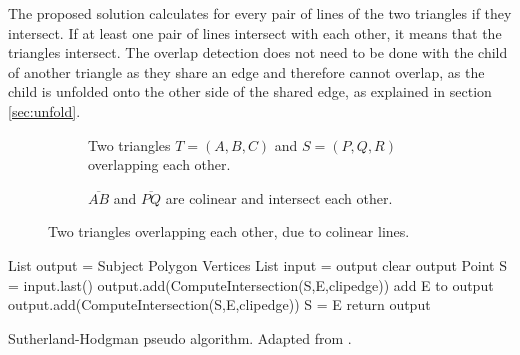 \documentclass[draft,final]{vutinfth} %
\begin{document}
The proposed solution calculates for every pair of lines of the two triangles if they intersect. If at least one pair of lines intersect with each other, it means that the triangles intersect. The overlap detection does not need to be done with the child of another triangle as they share an edge and therefore cannot overlap, as the child is unfolded onto the other side of the shared edge, as explained in section \ref{sec:unfold}.

\begin{figure}
\centering
\begin{subfigure}[t]{.4\textwidth}
	
  \caption{Two triangles $T = (A,B,C)$ and $S = (P,Q,R)$ overlapping each other.}
\end{subfigure}%
\hspace{.1\textwidth}
\begin{subfigure}[t]{.4\textwidth}
	
	\caption{$\overline{AB}$ and $\overline{PQ}$ are colinear and intersect each other.}
\end{subfigure}
\caption{Two triangles overlapping each other, due to colinear lines.}
\label{fig:colinearoverlap}
\end{figure}

\begin{algorithm}
List output = Subject Polygon Vertices\;
{
List input = output\;
clear output\;
Point S = input.last()\;
{
{
{
output.add(ComputeIntersection(S,E,clipedge))\;
}
add E to output\;
}
{
{
output.add(ComputeIntersection(S,E,clipedge))\;
}
S = E\;
}
}
}
return output\;
\caption{Sutherland-Hodgman pseudo algorithm. Adapted from \cite{wiki:polygonclip}.}
\label{alg:polyclip}
\end{algorithm}
\end{document}
